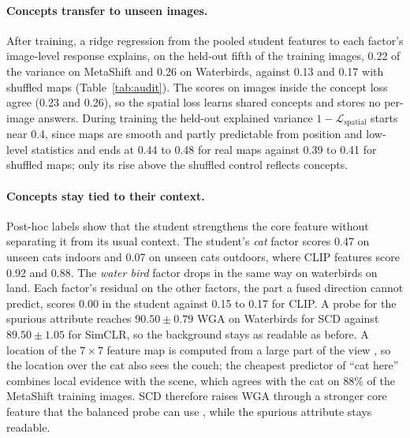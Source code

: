 \documentclass{article}
\begin{document}
\paragraph{Concepts transfer to unseen images.} After training, a ridge regression from the pooled student features to each factor's image-level response explains, on the held-out fifth of the training images, 0.22 of the variance on MetaShift and 0.26 on Waterbirds, against 0.13 and 0.17 with shuffled maps (Table~\ref{tab:audit}). The scores on images inside the concept loss agree (0.23 and 0.26), so the spatial loss learns shared concepts and stores no per-image answers. During training the held-out explained variance $1-\mathcal{L}_{\mathrm{spatial}}$ starts near 0.4, since maps are smooth and partly predictable from position and low-level statistics and ends at 0.44 to 0.48 for real maps against 0.39 to 0.41 for shuffled maps; only its rise above the shuffled control reflects concepts.

\paragraph{Concepts stay tied to their context.} Post-hoc labels show that the student strengthens the core feature without separating it from its usual context. The student's \emph{cat} factor scores 0.47 on unseen cats indoors and 0.07 on unseen cats outdoors, where CLIP features score 0.92 and 0.88. The \emph{water bird} factor drops in the same way on waterbirds on land. Each factor's residual on the other factors, the part a fused direction cannot predict, scores 0.00 in the student against 0.15 to 0.17 for CLIP. A probe for the spurious attribute reaches $90.50\pm0.79$ WGA on Waterbirds for SCD against $89.50\pm1.05$ for SimCLR, so the background stays as readable as before. A location of the $7\times7$ feature map is computed from a large part of the view \citep{luo2016erf}, so the location over the cat also sees the couch; the cheapest predictor of ``cat here'' combines local evidence with the scene, which agrees with the cat on 88\% of the MetaShift training images. SCD therefore raises WGA through a stronger core feature that the balanced probe can use \citep{kirichenko2023dfr}, while the spurious attribute stays readable.
\end{document}
